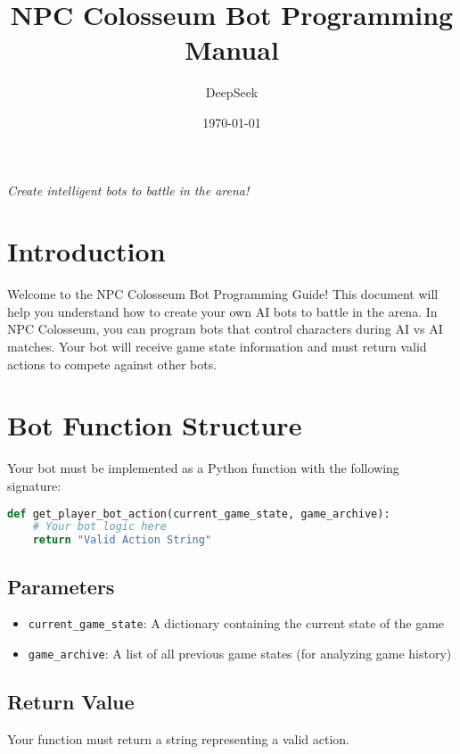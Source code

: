 \documentclass[12pt]{article}
\title{\Huge\textbf{NPC Colosseum Bot Programming Manual}}
\author{DeepSeek}
\date{\today}
\begin{document}
\maketitle

\begin{center}
\textit{Create intelligent bots to battle in the arena!}
\end{center}

\vspace{2em}

\tableofcontents
\newpage

\section{Introduction}
\label{sec:introduction}

Welcome to the NPC Colosseum Bot Programming Guide! This document will help you understand how to create your own AI bots to battle in the arena. In NPC Colosseum, you can program bots that control characters during AI vs AI matches. Your bot will receive game state information and must return valid actions to compete against other bots.

\section{Bot Function Structure}
\label{sec:bot-structure}

Your bot must be implemented as a Python function with the following signature:

\begin{lstlisting}[language=Python, caption=Bot Function Signature]
def get_player_bot_action(current_game_state, game_archive):
    # Your bot logic here
    return "Valid Action String"
\end{lstlisting}

\subsection{Parameters}
\begin{itemize}
    \item \texttt{current\_game\_state}: A dictionary containing the current state of the game
    \item \texttt{game\_archive}: A list of all previous game states (for analyzing game history)
\end{itemize}

\subsection{Return Value}
Your function must return a string representing a valid action.
\end{document}
